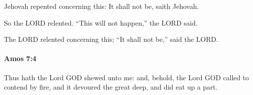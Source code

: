 			\begin{versebox}
					\item[BHS] 
					\item[LXX] 
					\item[ASV] Jehovah repented concerning this: It shall not be, saith Jehovah.
					\item[NIV] So the LORD relented. “This will not happen,” the LORD said.
					\item[NRSV] The LORD relented concerning this; “It shall not be,” said the LORD.
			\end{versebox}

		\paragraph{Amos 7:4} %
			\label{AMOS-7-4}

			Thus hath the Lord GOD shewed unto me: and, behold, the Lord GOD called to contend by fire, and it devoured the great deep, and did eat up a part.

